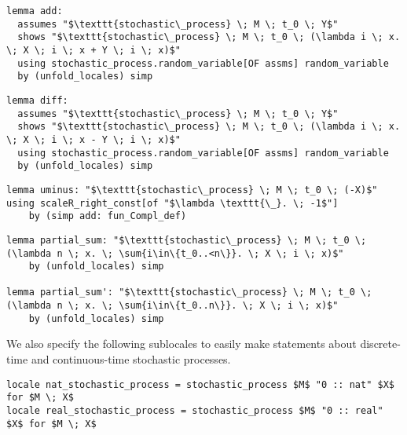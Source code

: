 \begin{isalemma}
{\small
\begin{lstlisting}[style=isabelle]
lemma add:
  assumes "$\texttt{stochastic\_process} \; M \; t_0 \; Y$"
  shows "$\texttt{stochastic\_process} \; M \; t_0 \; (\lambda i \; x. \; X \; i \; x + Y \; i \; x)$"
  using stochastic_process.random_variable[OF assms] random_variable 
  by (unfold_locales) simp
\end{lstlisting}
}
\end{isalemma}

\begin{isalemma}
{\small
\begin{lstlisting}[style=isabelle]
lemma diff:
  assumes "$\texttt{stochastic\_process} \; M \; t_0 \; Y$"
  shows "$\texttt{stochastic\_process} \; M \; t_0 \; (\lambda i \; x. \; X \; i \; x - Y \; i \; x)$"
  using stochastic_process.random_variable[OF assms] random_variable 
  by (unfold_locales) simp
\end{lstlisting}
}
\end{isalemma}

\begin{isalemma}
{\small
\begin{lstlisting}[style=isabelle]
lemma uminus: "$\texttt{stochastic\_process} \; M \; t_0 \; (-X)$" using scaleR_right_const[of "$\lambda \texttt{\_}. \; -1$"] 
	by (simp add: fun_Compl_def)
\end{lstlisting}
}
\end{isalemma}

\begin{isalemma}
{\small
\begin{lstlisting}[style=isabelle]
lemma partial_sum: "$\texttt{stochastic\_process} \; M \; t_0 \; (\lambda n \; x. \; \sum{i\in\{t_0..<n\}}. \; X \; i \; x)$" 
	by (unfold_locales) simp

lemma partial_sum': "$\texttt{stochastic\_process} \; M \; t_0 \; (\lambda n \; x. \; \sum{i\in\{t_0..n\}}. \; X \; i \; x)$" 
	by (unfold_locales) simp
\end{lstlisting}
}
\end{isalemma}

We also specify the following sublocales to easily make statements about discrete-time and continuous-time stochastic processes.

\begin{isadefinition}
{\small
\begin{lstlisting}[style=isabelle]
locale nat_stochastic_process = stochastic_process $M$ "0 :: nat" $X$ for $M \; X$
locale real_stochastic_process = stochastic_process $M$ "0 :: real" $X$ for $M \; X$
\end{lstlisting}
}
\end{isadefinition}

